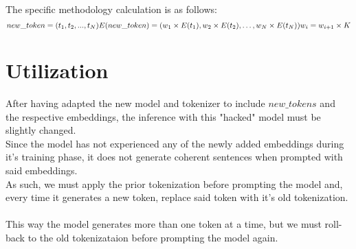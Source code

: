 The specific methodology calculation is as follows:
$$
new\_token = (t_1, t_2, ..., t_N) \\ 
E(new\_token) = (w_1 \times E(t_1), w_2 \times E(t_2), \dots, w_N \times E(t_N)) \\
w_i = w_{i+1} \times K
$$


\section{Utilization}
After having adapted the new model and tokenizer to include $new\_tokens$ and the respective embeddings, the inference
with this "hacked" model must be slightly changed. \\
Since the model has not experienced any of the newly added embeddings during it's training phase, it does not generate coherent
sentences when prompted with said embeddings.\\
As such, we must apply the prior tokenization before prompting the model and, every time it generates a new token, replace said token
with it's old tokenization.\\
\\
This way the model generates more than one token at a time, but we must roll-back to the old tokenizataion before prompting the model again.



